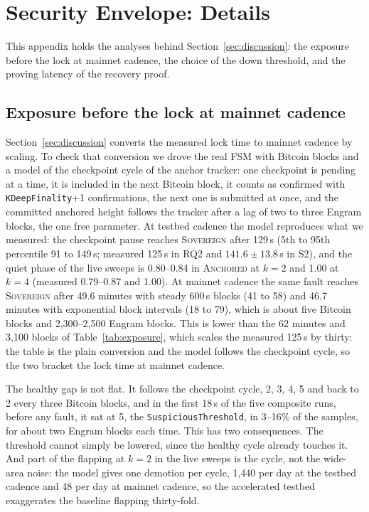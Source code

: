 \section{Security Envelope: Details}
\label{app:envelope}

This appendix holds the analyses behind Section~\ref{sec:discussion}: the exposure before the lock at mainnet cadence, the choice of the down threshold, and the proving latency of the recovery proof.

\subsection*{Exposure before the lock at mainnet cadence}

Section~\ref{sec:discussion} converts the measured lock time to mainnet cadence by
scaling. To check that conversion we drove the real FSM with Bitcoin blocks and a model of
the checkpoint cycle of the anchor tracker: one checkpoint is pending at a time,
it is included in the next Bitcoin block, it counts as confirmed with
\texttt{KDeepFinality}+1 confirmations, the next one is submitted at once, and
the committed anchored height follows the tracker after a lag of two to three
Engram blocks, the one free parameter. At testbed cadence the model reproduces
what we measured: the checkpoint pause reaches \textsc{Sovereign} after 129\,s
(5th to 95th percentile 91 to 149\,s; measured 125\,s in RQ2 and $141.6 \pm
13.8$\,s in S2), and the quiet phase of the live sweeps is 0.80--0.84 in
\textsc{Anchored} at $k{=}2$ and 1.00 at $k{=}4$ (measured 0.79--0.87 and 1.00).
At mainnet cadence the same fault reaches \textsc{Sovereign} after 49.6 minutes
with steady 600\,s blocks (41 to 58) and 46.7 minutes with exponential block
intervals (18 to 79), which is about five Bitcoin blocks and 2{,}300--2{,}500
Engram blocks. This is lower than the 62 minutes and 3{,}100 blocks of
Table~\ref{tab:exposure}, which scales the measured 125\,s by thirty: the table is
the plain conversion and the model follows the checkpoint cycle, so the two
bracket the lock time at mainnet cadence.

The healthy gap is not flat. It follows the checkpoint cycle, 2, 3, 4, 5 and
back to 2 every three Bitcoin blocks, and in the first 18\,s of the five
composite runs, before any fault, it sat at 5, the \texttt{SuspiciousThreshold},
in 3--16\% of the samples, for about two Engram blocks each time. This has two
consequences. The threshold cannot simply be lowered, since the healthy cycle
already touches it. And part of the flapping at $k{=}2$ in the live sweeps is the
cycle, not the wide-area noise: the model gives one demotion per cycle, 1{,}440
per day at the testbed cadence and 48 per day at mainnet cadence, so the
accelerated testbed exaggerates the baseline flapping thirty-fold.

